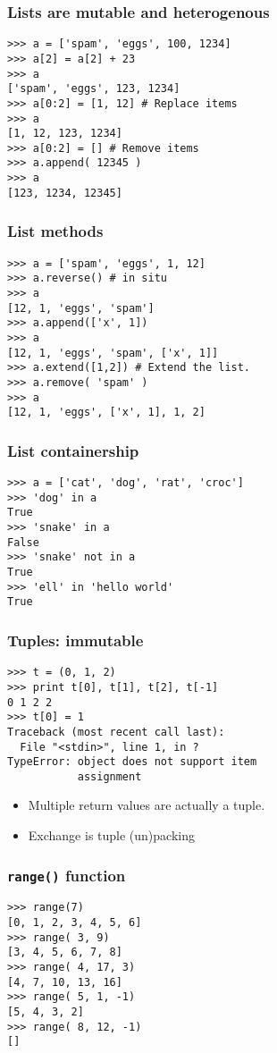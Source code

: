 \documentclass[14pt,compress]{beamer}
\newcommand{\typ}[1]{\texttt{#1}}
\begin{document}
\begin{frame}[fragile]
  \frametitle{Lists are mutable and heterogenous}
\begin{lstlisting}
>>> a = ['spam', 'eggs', 100, 1234]
>>> a[2] = a[2] + 23
>>> a
['spam', 'eggs', 123, 1234]
>>> a[0:2] = [1, 12] # Replace items
>>> a
[1, 12, 123, 1234]
>>> a[0:2] = [] # Remove items
>>> a.append( 12345 )
>>> a
[123, 1234, 12345]
\end{lstlisting}
\end{frame}

\begin{frame}[fragile]
  \frametitle{List methods}
\begin{lstlisting}
>>> a = ['spam', 'eggs', 1, 12]
>>> a.reverse() # in situ
>>> a
[12, 1, 'eggs', 'spam']
>>> a.append(['x', 1]) 
>>> a
[12, 1, 'eggs', 'spam', ['x', 1]]
>>> a.extend([1,2]) # Extend the list.
>>> a.remove( 'spam' )
>>> a
[12, 1, 'eggs', ['x', 1], 1, 2]
\end{lstlisting}
\end{frame}

\begin{frame}[fragile]
  \frametitle{List containership}
  \begin{lstlisting}
>>> a = ['cat', 'dog', 'rat', 'croc']
>>> 'dog' in a
True
>>> 'snake' in a
False
>>> 'snake' not in a
True
>>> 'ell' in 'hello world'
True
  \end{lstlisting}
\end{frame}

\begin{frame}[fragile]
  \frametitle{Tuples: immutable}
\begin{lstlisting}
>>> t = (0, 1, 2)
>>> print t[0], t[1], t[2], t[-1] 
0 1 2 2
>>> t[0] = 1
Traceback (most recent call last):
  File "<stdin>", line 1, in ?
TypeError: object does not support item
           assignment
\end{lstlisting}  
\begin{itemize}
    \item Multiple return values are actually a tuple.
    \item Exchange is tuple (un)packing
\end{itemize}

\end{frame}

\begin{frame}[fragile]
  \frametitle{\typ{range()} function}
  \begin{lstlisting}
>>> range(7)
[0, 1, 2, 3, 4, 5, 6]
>>> range( 3, 9)
[3, 4, 5, 6, 7, 8]
>>> range( 4, 17, 3)
[4, 7, 10, 13, 16]
>>> range( 5, 1, -1)
[5, 4, 3, 2]
>>> range( 8, 12, -1)
[]
  \end{lstlisting}
\end{frame}
\end{document}
